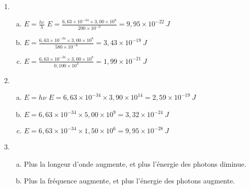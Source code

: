 \documentclass[12pt, a4paper]{article}
\begin{document}
    \begin{Exercise}[number={18}]
        \begin{enumerate}[1.]
            \item	\begin{enumerate}[a.]
                        \item	$E=\frac{hc}{\lambda}$ \quad $E=\frac{6{,}63\times 10^{-34}\times 3{,}00\times 10^8}{200\times 10^{-6}}=9{,}95\times 10^{-22}\ \si{J}$
                        \item   $E=\frac{6{,}63\times 10^{-34}\times 3{,}00\times 10^8}{580\times 10^{-9}}=3{,}43\times 10^{-19}\ \si{J}$
                        \item   $E=\frac{6{,}63\times 10^{-34}\times 3{,}00\times 10^8}{0{,}100\times 10^3}=1{,}99\times 10^{-21}\ \si{J}$
                    \end{enumerate}
            \item   \begin{enumerate}[a.]
                        \item	$E=h\nu$ \quad $E=6{,}63\times 10^{-34}\times 3{,}90\times 10^{14}=2{,}59\times 10^{-19}\ \si{J}$
                        \item   $E=6{,}63\times 10^{-34}\times 5{,}00\times 10^{9}=3{,}32\times 10^{-24}\ \si{J}$
                        \item   $E=6{,}63\times 10^{-34}\times 1{,}50\times 10^{6}=9{,}95\times 10^{-28}\ \si{J}$
                    \end{enumerate}
            \item   \begin{enumerate}[a.]
                        \item	Plus la longeur d'onde augmente, et plus l'énergie des photons diminue.
                        \item   Plus la fréquence augmente, et plus l'énergie des photons augmente.
                    \end{enumerate}
        \end{enumerate}
    \end{Exercise}
\end{document}
